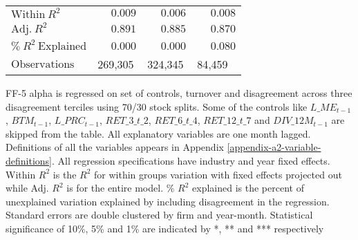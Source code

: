 \begin{table}
\begin{threeparttable}
\begin{tabular}[t]{>{\raggedright\arraybackslash}p{8cm}>{\raggedright\arraybackslash}p{1.9cm}>{\raggedright\arraybackslash}p{1.9cm}>{\raggedright\arraybackslash}p{1.9cm}}
$\textrm{Within} \: R^2$ & {$\phantom{-}0.009$} & {$\phantom{-}0.006$} & {$\phantom{-}0.008$}\\
$\textrm{Adj.} \: R^2$ & {$\phantom{-}0.891$} & {$\phantom{-}0.885$} & {$\phantom{-}0.870$}\\
$\% \: R^2 \: \textrm{Explained}$ & {$\phantom{-}0.000$} & {$\phantom{-}0.000$} & {$\phantom{-}0.080$}\\
$\textrm{Observations}$ & {\phantom{-}269,305} & {\phantom{-}324,345} & {\phantom{-}84,459}\\
\bottomrule
\end{tabular}
\begin{tablenotes}
\item FF-5 alpha is regressed on set of controls, turnover and disagreement across three disagreement terciles using 70/30 stock splits. Some of the controls like $L\_ME_{t-1}$, $BTM_{t-1}$, $L\_PRC_{t-1}$, $RET\_3\_t\_2$, $RET\_6\_t\_4$, $RET\_12\_t\_7$ and $DIV\_12M_{t-1}$ are skipped from the table. All explanatory variables are one month lagged. Definitions of all the variables appears in Appendix \ref{appendix-a2-variable-definitions}. All regression specifications have industry and year fixed effects. Within $R^2$ is the $R^2$ for within groups variation with fixed effects projected out while Adj. $R^2$ is for the entire model. \% $R^2$ explained is the percent of unexplained variation explained by including disagreement in the regression. Standard errors are double clustered by firm and year-month. Statistical significance of 10\%, 5\% and 1\% are indicated by *, ** and *** respectively
\end{tablenotes}
\end{threeparttable}
\end{table}